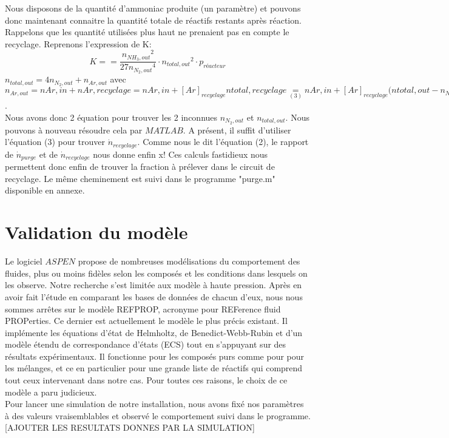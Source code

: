 \documentclass[a4paper, oneside, 12pt]{article}
\begin{document}
Nous disposons de la quantité d'ammoniac produite (un paramètre) et pouvons donc maintenant connaitre la quantité totale de réactifs restants après réaction. Rappelons que les quantité utilisées plus haut ne prenaient pas en compte le recyclage. Reprenons l'expression de K: \\
$$K==\frac{{n_{NH_3,out}}^2}{27{n_{N_2,out}}^4}\cdot {n_{total,out}}^2\cdot p_{réacteur}$$
$n_{total,out}=4n_{N_2,out}+n_{Ar,out}$ avec $n_{Ar,out}=n{Ar,in}+n{Ar,recyclage}=n{Ar,in}+[Ar]_{recyclage}n{total,recyclage}\underset{(3)}=n{Ar,in}+[Ar]_{recyclage}(n{total,out}-n_{NH_3,out}$.\\
Nous avons donc 2 équation pour trouver les 2 inconnues $n_{N_2,out}$ et $n_{total,out}$. Nous pouvons à nouveau résoudre cela par $MATLAB$. A présent, il suffit d'utiliser l'équation (3) pour trouver $\dot{n}_{recyclage}$. Comme nous le dit l'équation (2), le rapport de $\dot{n}_{purge}$ et de $\dot{n}_{recyclage}$ nous donne enfin x! Ces calculs fastidieux nous permettent donc enfin de trouver la fraction à prélever dans le circuit de recyclage. Le même cheminement est suivi dans le programme "purge.m" disponible en annexe.

\section{Validation du modèle}
Le logiciel $ASPEN$ propose de nombreuses modélisations du comportement des fluides, plus ou moins fidèles selon les composés et les conditions dans lesquels on les observe. Notre recherche s'est limitée aux modèle à haute pression. Après en avoir fait l'étude en comparant les bases de données de chacun d'eux, nous nous sommes arrêtes sur le modèle REFPROP, acronyme pour REFerence fluid PROPerties. Ce dernier est actuellement le modèle le plus précis existant. Il implémente les équations d'état de Helmholtz, de Benedict-Webb-Rubin et d'un modèle étendu de correspondance d'états (ECS) tout en s'appuyant sur des résultats expérimentaux. Il fonctionne pour les composés purs comme pour pour les mélanges, et ce en particulier pour une grande liste de réactifs qui comprend tout ceux intervenant dans notre cas. Pour toutes ces raisons, le choix de ce modèle a paru judicieux.\\
Pour lancer une simulation de notre installation, nous avons fixé nos paramètres à des valeurs vraisemblables et observé le comportement suivi dans le programme. 
[AJOUTER LES RESULTATS DONNES PAR LA SIMULATION]
\end{document}
